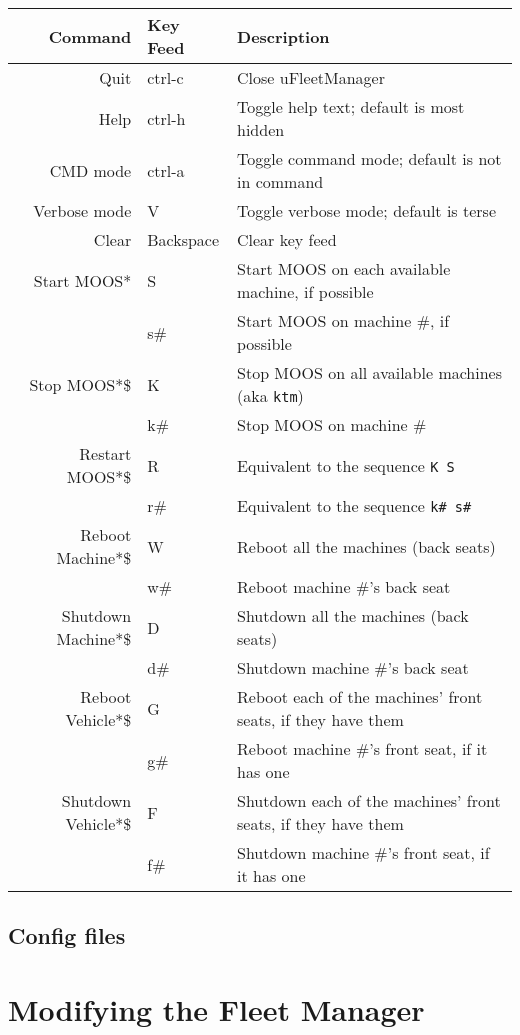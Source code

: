 \documentclass[11pt]{article}
\begin{document}
\begin{tabular}{r|ll}
Command & Key Feed & Description\\
\hline
Quit & ctrl-c & Close uFleetManager\\
Help & ctrl-h & Toggle help text; default is most hidden\\
CMD mode & ctrl-a & Toggle command mode; default is not in command\\
Verbose mode & V & Toggle verbose mode; default is terse\\
Clear & Backspace & Clear key feed\\ 
Start MOOS* & S & Start MOOS on each available machine, if possible\\
& s\# & Start MOOS on machine \#, if possible\\
Stop MOOS*\$ & K & Stop MOOS on all available machines (aka \texttt{ktm})\\
& k\# & Stop MOOS on machine \#\\
Restart MOOS*\$ & R & Equivalent to the sequence \texttt{K S}\\
& r\# & Equivalent to the sequence \texttt{k\# s\#}\\
Reboot Machine*\$ & W & Reboot all the machines (back seats)\\
& w\# & Reboot machine \#'s back seat\\
Shutdown Machine*\$ & D & Shutdown all the machines (back seats)\\
& d\# & Shutdown machine \#'s back seat\\
Reboot Vehicle*\$ & G & Reboot each of the machines' front seats, if they have them\\
& g\# & Reboot machine \#'s front seat, if it has one\\
Shutdown Vehicle*\$ & F & Shutdown each of the machines' front seats, if they have them\\
& f\# & Shutdown machine \#'s front seat, if it has one
\end{tabular}
\subsection{Config files}
\section{Modifying the Fleet Manager}
\end{document}

